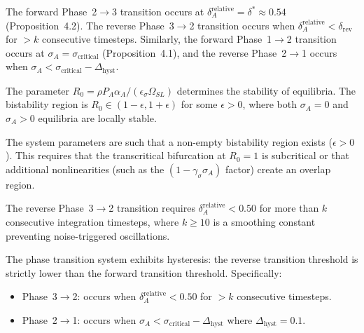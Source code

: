 
\begin{definition}
The forward Phase~2$\to$3 transition occurs at
$\delta_A^{\text{relative}} = \delta^* \approx 0.54$
(Proposition~4.2). The reverse Phase~3$\to$2 transition occurs when
$\delta_A^{\text{relative}} < \delta_{\text{rev}}$ for $> k$ consecutive
timesteps. Similarly, the forward Phase~1$\to$2 transition occurs at
$\sigma_A = \sigma_{\text{critical}}$ (Proposition~4.1), and the
reverse Phase~2$\to$1 occurs when
$\sigma_A < \sigma_{\text{critical}} - \Delta_{\text{hyst}}$.
\end{definition}

\begin{definition}
The parameter $R_0 = \rho P_A \alpha_A / (\epsilon_\sigma \Omega_{SL})$
determines the stability of equilibria. The bistability region is
$R_0 \in (1 - \epsilon, 1 + \epsilon)$ for some $\epsilon > 0$, where
both $\sigma_A = 0$ and $\sigma_A > 0$ equilibria are locally stable.
\end{definition}

\begin{assumption}
The system parameters are such that a non-empty bistability region
exists ($\epsilon > 0$). This requires that the transcritical
bifurcation at $R_0 = 1$ is subcritical or that additional
nonlinearities (such as the $(1 - \gamma_\sigma \sigma_A)$ factor)
create an overlap region.
\end{assumption}

\begin{assumption}
The reverse Phase~3$\to$2 transition requires $\delta_A^{\text{relative}} < 0.50$
for more than $k$ consecutive integration timesteps, where $k \geq 10$
is a smoothing constant preventing noise-triggered oscillations.
\end{assumption}

\begin{proposition}
\label{prop:hysteresis}
The phase transition system exhibits hysteresis: the reverse transition
threshold is strictly lower than the forward transition threshold.
Specifically:
\begin{itemize}[nosep]
\item Phase~3$\to$2: occurs when $\delta_A^{\text{relative}} < 0.50$
  for $> k$ consecutive timesteps.
\item Phase~2$\to$1: occurs when $\sigma_A < \sigma_{\text{critical}} - \Delta_{\text{hyst}}$
  where $\Delta_{\text{hyst}} = 0.1$.
\end{itemize}
\end{proposition}

